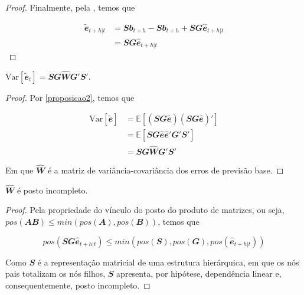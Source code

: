\begin{apendicesenv}
\begin{proof}
  Finalmente, pela , temos que

  \begin{align}
    \mathbfit{\tilde{e}}_{t+h|t} &=  \mathbfit{Sb}_{t+h} - \mathbfit{Sb}_{t+h}  + \mathbfit{SG\hat{e}}_{t+h|t}  \\
    &= \mathbfit{SG\hat{e}}_{t+h|t}
  \end{align}
\end{proof}

\begin{proposition}
  \label{proposicao3}

  $\text{Var}[\mathbfit{\tilde{e}}_t] = \mathbfit{SG\hat{W}G'S'}$.

\end{proposition}

\begin{proof}
  Por \ref{proposicao2}, temos que

  \begin{align}
    \text{Var}[\mathbfit{\tilde{e}}] &= \mathbb{E}[\mathbfit{(SG\hat{e})(SG\hat {e})'}] \\
    &= \mathbb{E}[\mathbfit{SG\hat{e}\hat{e}'G'S'}] \\
    &= \mathbfit{SG\hat{W}G'S'}
  \end{align}

  Em que $\mathbfit{\hat{W}}$ é a matriz de variância-covariância dos erros de  previsão base.
\end{proof}

\begin{proposition}
  \label{proposicao4}

  $\mathbfit{\hat{W}}$ é posto incompleto.

\end{proposition}

\begin{proof}
  Pela propriedade do vínculo do posto do produto de matrizes, ou seja, $pos(\mathbfit{AB}) \leq min(pos(\mathbfit{A}), pos(\mathbfit{B}))$, temos que
  
  \begin{equation}
    pos(\mathbfit{SG\hat{e}}_{t+h|t}) \leq min(pos(\mathbfit{S}), pos(\mathbfit{G}), pos(\mathbfit{\hat{e}}_{t+h|t})) \label{eq:ap_a_4_1}
  \end{equation}

  Como $\mathbfit{S}$ é a representação matricial de uma estrutura hierárquica, em que os nós pais totalizam os nós filhos, $\mathbfit{S}$ apresenta, por hipótese, dependência linear e, consequentemente, posto incompleto.


\end{proof}
\end{apendicesenv}
